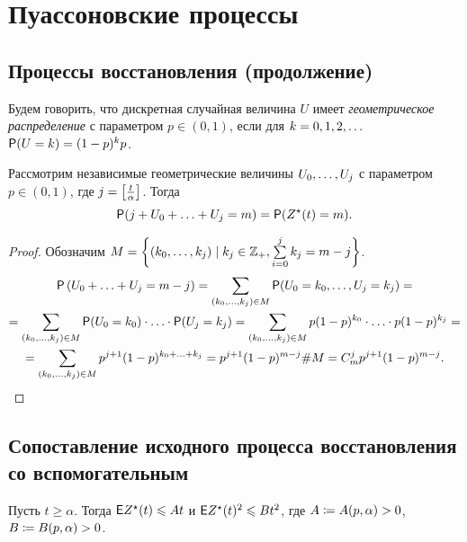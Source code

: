 \chapter{Пуассоновские процессы}

\section{Процессы восстановления (продолжение)}

\begin{df}
	Будем говорить, что дискретная случайная величина $U$ имеет
	\textit{геометрическое распределение} с параметром $p \in (0, 1)$,
	если для $k = 0, 1, 2,\ldots$ $\mathsf{P}(U = k) = (1 - p)^k p$.
\end{df}

\begin{lemma}\label{lemsum}
	Рассмотрим независимые геометрические величины $U_0 ,\ldots, U_j$ с параметром $p \in (0, 1)$,
	где $j = \left[\frac t \alpha\right]$.
Тогда
	\[
		\Pf (j + U_0 \spl U_j = m)
	=	\Pf (Z^{\star}(t) = m ).
	\]
\end{lemma}

\begin{proof}
	 Обозначим $M = \left\{ (k_0,\ldots, k_j)\mid k_j \in \mathbb{Z}_+, \sum\limits_{i = 0}^j k_j = m - j\right\}$.
	\begin{multline*}
		\Pf\hr{ U_0 \spl U_j = m - j}
	=	\sum_{(k_0 \sco k_j) \in M} \Pf(U_0 = k_0 \sco U_j = k_j) = \\
	=	\sum_{(k_0 \sco k_j) \in M} \Pf(U_0 = k_0) \sd \Pf(U_j = k_j)
	=	\sum_{(k_0 \sco k_j) \in M} p (1 - p)^{k_0} \sd p (1 - p)^{k_j} = \\
	=	\sum_{(k_0 \sco k_j) \in M} p^{j + 1} (1 - p)^{k_0 \spl k_j}
	=	p^{j + 1} (1 - p)^{m - j} \#M = C_m^j p^{j + 1} (1 - p)^{m - j}.
	\end{multline*}
\end{proof}

\section{Сопоставление исходного процесса восстановления со вспомогательным}

\begin{lemma}\label{est}
	Пусть $t \ge \alpha$.
	Тогда $\mathsf{E} Z^\star(t) \leqslant At$ и $\mathsf{E} Z^\star(t)^2 \leqslant B t^2$,
	где $A \coloneqq A(p, \alpha) > 0$, $B \coloneqq B(p, \alpha) > 0$.
\end{lemma}


